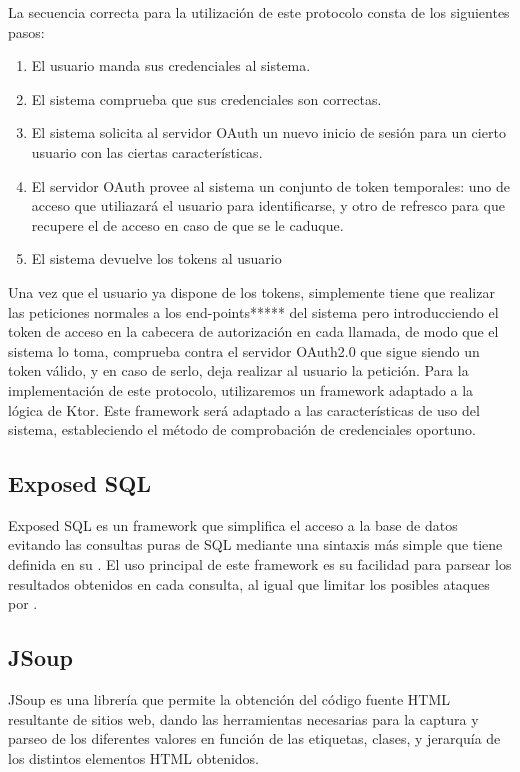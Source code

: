 La secuencia correcta para la utilización de este protocolo consta de los siguientes pasos:

\begin{enumerate}
        \item El usuario manda sus credenciales al sistema.
        \item El sistema comprueba que sus credenciales son correctas.
        \item El sistema solicita al servidor OAuth un nuevo inicio de sesión para un cierto usuario con las ciertas características.
        \item El servidor OAuth provee al sistema un conjunto de token temporales: uno de acceso que utiliazará el usuario para identificarse, y otro de refresco para que recupere el de acceso en caso de que se le caduque.
        \item El sistema devuelve los tokens al usuario
\end{enumerate}
Una vez que el usuario ya dispone de los tokens, simplemente tiene que realizar las peticiones normales a los end-points***** del sistema pero introducciendo el token de acceso en la cabecera de autorización en cada llamada, de modo que el sistema lo toma, comprueba contra el servidor OAuth2.0 que sigue siendo un token válido, y en caso de serlo, deja realizar al usuario la petición.
Para la implementación de este protocolo, utilizaremos un framework adaptado a la lógica de Ktor. 
Este framework será adaptado a las características de uso del sistema, estableciendo el método de comprobación de credenciales oportuno. 

    \subsection{Exposed SQL}

Exposed SQL es un framework que simplifica el acceso a la base de datos evitando las consultas puras de SQL mediante una sintaxis más simple que tiene definida en su .
El uso principal de este framework es su facilidad para parsear los resultados obtenidos en cada consulta, al igual que limitar los posibles ataques por .

    \subsection{JSoup}

JSoup es una librería que permite la obtención del código fuente HTML resultante de sitios web, dando las herramientas necesarias para la captura y parseo de los diferentes valores en función de las etiquetas, clases, y jerarquía de los distintos elementos HTML obtenidos.
    
